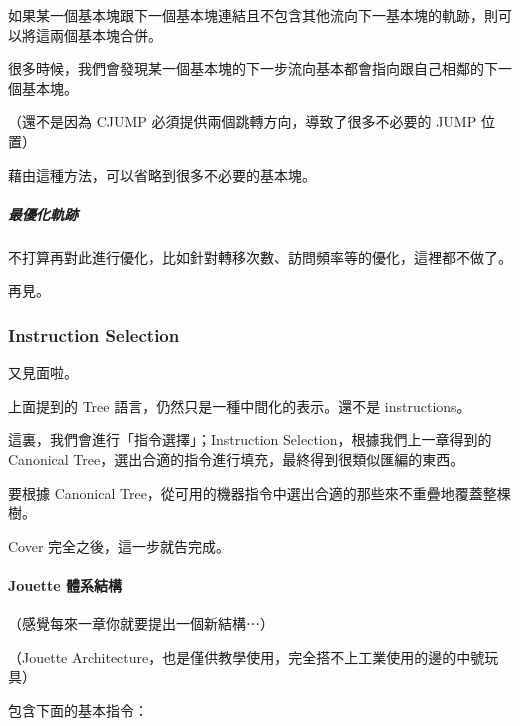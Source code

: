 \documentclass[
]{article}
\begin{document}
如果某一個基本塊跟下一個基本塊連結且不包含其他流向下一基本塊的軌跡，則可以將這兩個基本塊合併。

很多時候，我們會發現某一個基本塊的下一步流向基本都會指向跟自己相鄰的下一個基本塊。

（還不是因為 CJUMP 必須提供兩個跳轉方向，導致了很多不必要的 JUMP 位置）

藉由這種方法，可以省略到很多不必要的基本塊。

\hypertarget{header-n272}{%
\subparagraph{最優化軌跡}\label{header-n272}}

不打算再對此進行優化，比如針對轉移次數、訪問頻率等的優化，這裡都不做了。

再見。

\hypertarget{header-n275}{%
\subsubsection{Instruction Selection}\label{header-n275}}

又見面啦。

上面提到的 Tree 語言，仍然只是一種中間化的表示。還不是 instructions。

這裏，我們會進行「指令選擇」；Instruction
Selection，根據我們上一章得到的 Canonical
Tree，選出合適的指令進行填充，最終得到很類似匯編的東西。

要根據 Canonical
Tree，從可用的機器指令中選出合適的那些來不重疊地覆蓋整棵樹。

Cover 完全之後，這一步就告完成。

\hypertarget{header-n281}{%
\paragraph{Jouette 體系結構}\label{header-n281}}

（感覺每來一章你就要提出一個新結構⋯）

（Jouette
Architecture，也是僅供教學使用，完全搭不上工業使用的邊的中號玩具）

包含下面的基本指令：
\end{document}
